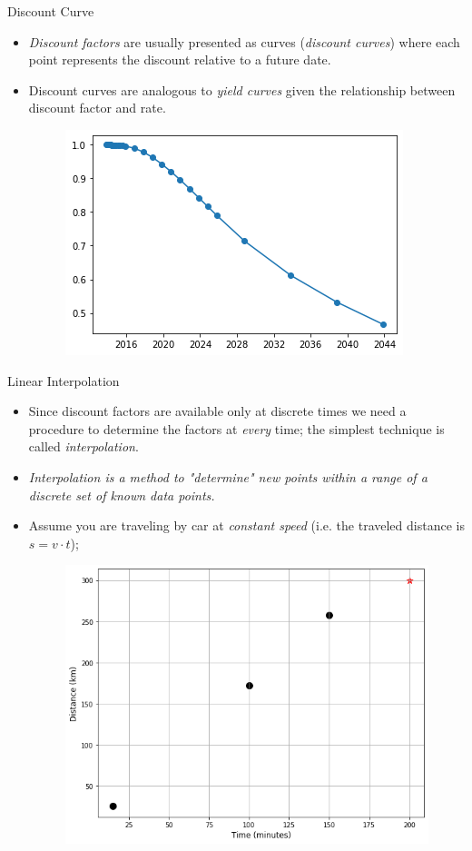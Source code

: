 \documentclass{beamer}
\begin{document}
\begin{frame}{Discount Curve}
  \begin{itemize}
  \item \emph{Discount factors} are usually presented as curves (\emph{discount curves}) where each point represents the discount relative to a future date.
  \item Discount curves are analogous to \emph{yield curves} given the relationship between discount factor and rate.
    \begin{figure}[h]
      \begin{center}
        \includegraphics[width=0.55\linewidth]{discount_curve}
      \end{center}
    \end{figure}
  \end{itemize}
\end{frame}

\begin{frame}{Linear Interpolation}
  \begin{itemize}
  \item Since discount factors are available only at discrete times we need a procedure to determine the factors at \emph{every} time; the simplest technique is called \emph{interpolation}.
  \item \emph{Interpolation is a method to "determine" new points within a range of a discrete set of known data points.}
  \item Assume you are traveling by car at \emph{constant speed} (i.e. the traveled distance is $s = v \cdot t$);
    \begin{figure}[h]
      \begin{center}
        \includegraphics[width=0.45\linewidth]{interp1}
      \end{center}
    \end{figure}
  \end{itemize}
\end{frame}
\end{document}
